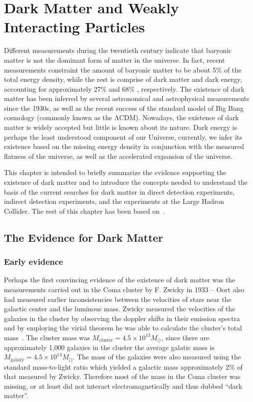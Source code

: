 \chapter{Dark Matter and Weakly Interacting Particles}
Different measurements during the twentieth century indicate that
baryonic matter is not the dominant form of matter in the
universe. In fact, recent measurements constraint the amount of baryonic matter
to be about 5\% of the total energy density, while the rest is
comprise of dark matter and dark energy, accounting for approximately 27\%  and 68\% ,
respectively. The existence of dark matter has been inferred by
several astronomical and astrophysical measurements since the 1930s,
as well as the recent success of the standard model of Big Bang
cosmology (commonly known as the $\mathrm{\Lambda CDM}$). Nowadays,
the existence of dark matter is widely accepted but little is known
about its nature. Dark energy is perhaps the least understood component
of our Universe, currently, we infer its existence based on the
missing energy density in conjunction with the measured flatness of
the universe, as well as the accelerated expansion of the universe.

This chapter is intended to briefly summarize the evidence supporting
the existence of dark matter and to introduce the concepts needed to
understand the basis of the current searches for dark matter in direct
detection experiments, indirect detection experiments, and the
experiments at the Large Hadron Collider. The rest of this chapter has
been based on~\cite{Golwala,DM_Primer}.

\section{The Evidence for Dark Matter}
\subsection{Early evidence}
Perhaps the first convincing evidence of the existence of dark matter
was the measurements carried out in the Coma cluster by F. Zwicky in
1933 -- Oort also had measured earlier inconsistencies between the
velocities of stars near the galactic center and the luminous
mass. Zwicky measured the velocities of the galaxies in the cluster by observing the
doppler shifts in their emission spectra and by employing the virial
theorem he was able to calculate the cluster's total mass~\cite{zwikcy1,ZZZZW}. The cluster
mass was $M_{\mathrm{cluster}} = 4.5\times10^{13}M_{\odot}$, since
there are approximately 1,000 galaxies in the cluster the average
galatic mass is $M_{\mathrm{galaxy}} = 4.5\times10^{13}M_{\odot}$. The
mass of the galaxies were also measured using the standard
mass-to-light ratio which yielded a galactic mass approximately 2\% of
that measured by Zwicky. Therefore most of the mass in the Coma
cluster was missing, or at least did not interact electromagnetically
and thus dubbed ``dark matter''.

